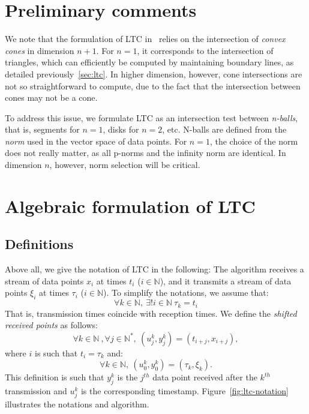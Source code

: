 \section{Preliminary comments}

We note that the formulation of LTC  in~\cite{schoellhammer2004lightweight}
relies on the intersection of  \emph{convex cones} in dimension $n+1$. For
$n=1$, it corresponds to  the intersection of triangles, which can efficiently
be computed by  maintaining boundary lines, as detailed
previously~\ref{sec:ltc}. In higher  dimension, however, cone intersections are
not so straightforward to compute, due  to the fact that the intersection
between cones may not be a cone.

To address this issue, we formulate LTC as an intersection test between
\emph{n-balls}, that is, segments for $n=1$, disks for
$n=2$, etc. N-balls are defined from the \emph{norm} used in
the vector space of data points. For $n=1$, the choice of the norm does
not really matter, as all p-norms and the infinity norm are identical.
In dimension $n$, however, norm selection will be critical.

\section{Algebraic formulation of LTC}

\subsection{Definitions}

Above all, we give the notation of LTC in the
following: The algorithm receives a stream of data points $x_i$ at times $t_i$
($i \in \mathbb{N}$), and it transmits a stream of data points $\xi_i$ at times
$\tau_i$ ($i \in \mathbb{N}$). To simplify the notations, we assume that:
\begin{equation}
\forall k \in \mathbb{N}, \  \exists ! i \in \mathbb{N} \  \tau_k = t_i
\end{equation}
That is, transmission times coincide with reception times.
We define the \emph{shifted received points} as follows:
\begin{equation}
\label{eq:ltc-2}
\forall k \in \mathbb{N}\ , \forall j \in \mathbb{N^*},\ (u^k_j, y^k_j) = (t_{i+j}, x_{i+j}), 
\end{equation}
where $i$ is such that $t_i = \tau_k$ and:
\begin{equation}
\label{eq:ltc-3}
\forall k \in \mathbb{N},\  (u^k_0, y^k_0) = (\tau_k, \xi_k).
\end{equation}
This definition is such that $y^k_j$ is the $j^{th}$ data point received
after the $k^{th}$ transmission and $u^k_j$ is the corresponding timestamp.
Figure~\ref{fig:ltc-notation} illustrates the notations and algorithm.

